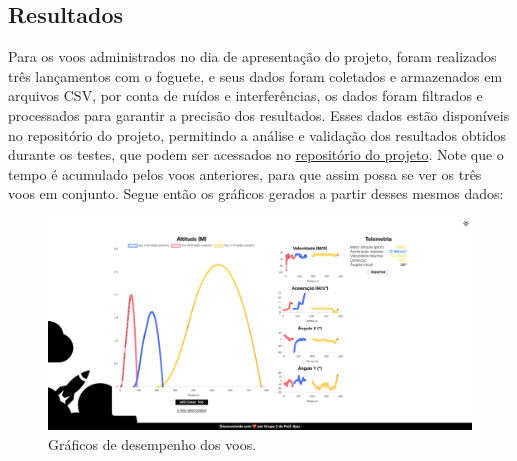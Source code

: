 \begin{samepage}
\subsection{Resultados}

Para os voos administrados no dia de apresentação do projeto, foram realizados três lançamentos com o foguete, e seus dados foram coletados e armazenados em arquivos CSV, por conta de ruídos e interferências, os dados foram filtrados e processados para garantir a precisão dos resultados. Esses dados estão disponíveis no repositório do projeto, permitindo a análise e validação dos resultados obtidos durante os testes, que podem ser acessados no \href{https://github.com/melohugo/PI1}{repositório do projeto}. Note que o tempo é acumulado pelos voos anteriores, para que assim possa se ver os três voos em conjunto. Segue então os gráficos gerados a partir desses mesmos dados:

\begin{landscape}

\begin{figure}[H]
\centering
\includegraphics[width=\linewidth,keepaspectratio]{figuras/software/graficos.jpeg}
\caption{Gráficos de desempenho dos voos.}
\label{fig_graficos}
\end{figure}

\end{landscape}

\end{samepage}
% 